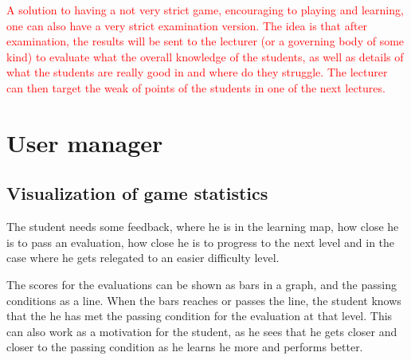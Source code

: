 


\textcolor{red}{A solution to having a not very strict game, encouraging to playing and learning, one can also have a very strict examination version. The idea is that after examination, the results will be sent to the lecturer (or a governing body of some kind) to evaluate what the overall knowledge of the students, as well as details of what the students are really good in and where do they struggle. The lecturer can then target the weak of points of the students in one of the next lectures. }




\section{User manager}
\subsection{Visualization of game statistics}
The student needs some feedback, where he is in the learning map, how close he is to pass an evaluation, how close he is to progress to the next level and in the case where he gets relegated to an easier difficulty level.

The scores for the evaluations can be shown as bars in a graph, and the passing conditions as a line. When the bars reaches or passes the line, the student knows that the he has met the passing condition for the evaluation at that level. This can also work as a motivation for the student, as he sees that he gets closer and closer to the passing condition as he learns he more and performs better.

